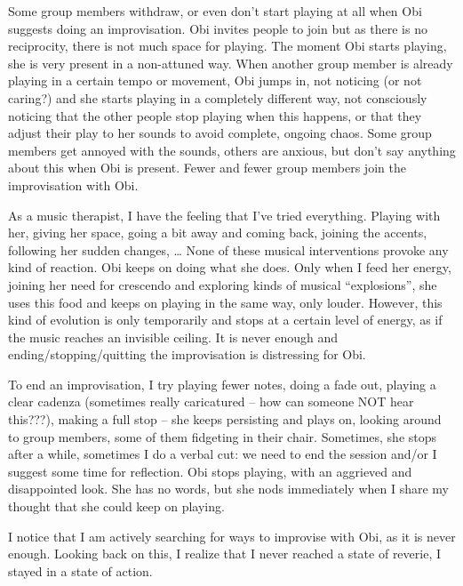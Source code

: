 \documentclass[authordate, empirical, issue]{jote-new-article}
\begin{document}
Some group members withdraw, or even don't start playing at all when Obi suggests doing an improvisation. Obi invites people to join but as there is no reciprocity, there is not much space for playing. The moment Obi starts playing, she is very present in a non-attuned way. When another group member is already playing in a certain tempo or movement, Obi jumps in, not noticing (or not caring?) and she starts playing in a completely different way, not consciously noticing that the other people stop playing when this happens, or that they adjust their play to her sounds to avoid complete, ongoing chaos. Some group members get annoyed with the sounds, others are anxious, but don't say anything about this when Obi is present. Fewer and fewer group members join the improvisation with Obi.



As a music therapist, I have the feeling that I've tried everything. Playing with her, giving her space, going a bit away and coming back, joining the accents, following her sudden changes, … None of these musical interventions provoke any kind of reaction. Obi keeps on doing what she does. Only when I feed her energy, joining her need for crescendo and exploring kinds of musical “explosions”, she uses this food and keeps on playing in the same way, only louder. However, this kind of evolution is only temporarily and stops at a certain level of energy, as if the music reaches an invisible ceiling. It is never enough and ending/stopping/quitting the improvisation is distressing for Obi.



To end an improvisation, I try playing fewer notes, doing a fade out, playing a clear cadenza (sometimes really caricatured -- how can someone NOT hear this???), making a full stop -- she keeps persisting and plays on, looking around to group members, some of them fidgeting in their chair. Sometimes, she stops after a while, sometimes I do a verbal cut: we need to end the session and/or I suggest some time for reflection. Obi stops playing, with an aggrieved and disappointed look. She has no words, but she nods immediately when I share my thought that she could keep on playing.



I notice that I am actively searching for ways to improvise with Obi, as it is never enough. Looking back on this, I realize that I never reached a state of reverie, I stayed in a state of action.
\end{document}
